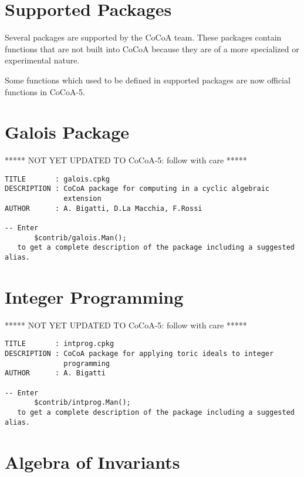 \documentclass[a4paper]{mybook}
\begin{document}
\noindent



\section{Supported Packages}
\label{Supported Packages}

        
Several packages are supported by the CoCoA team.  These packages
contain functions that are not built into CoCoA because they are of a
more specialized or experimental nature.
\par 
Some functions which used to be defined in supported packages are now
official functions in CoCoA-5.


\section{Galois Package}
\label{Galois Package}

        
***** NOT YET UPDATED TO CoCoA-5: follow with care *****
\par 
\begin{verbatim}
TITLE       : galois.cpkg
DESCRIPTION : CoCoA package for computing in a cyclic algebraic
              extension
AUTHOR      : A. Bigatti, D.La Macchia, F.Rossi

-- Enter
       $contrib/galois.Man();
   to get a complete description of the package including a suggested alias.
\end{verbatim}


\section{Integer Programming}
\label{Integer Programming}

        
***** NOT YET UPDATED TO CoCoA-5: follow with care *****
\par 
\begin{verbatim}
TITLE       : intprog.cpkg
DESCRIPTION : CoCoA package for applying toric ideals to integer
              programming
AUTHOR      : A. Bigatti

-- Enter
       $contrib/intprog.Man();
   to get a complete description of the package including a suggested alias.
\end{verbatim}


\section{Algebra of Invariants}
\label{Algebra of Invariants}
\end{document}
